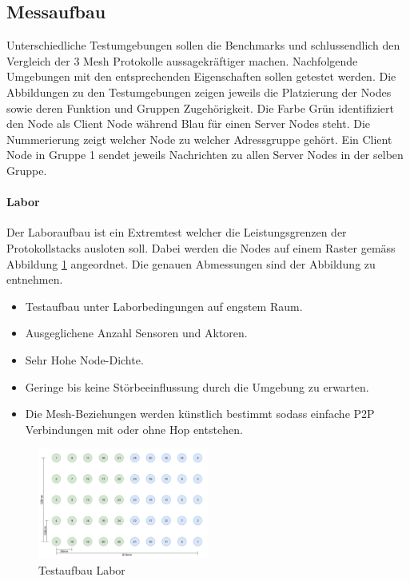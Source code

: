 \newpage
\subsection{Messaufbau}
Unterschiedliche Testumgebungen sollen die Benchmarks und schlussendlich den Vergleich der 3 Mesh Protokolle aussagekräftiger machen. Nachfolgende Umgebungen mit den entsprechenden Eigenschaften sollen getestet werden. Die Abbildungen zu den Testumgebungen zeigen jeweils die Platzierung der Nodes sowie deren Funktion und Gruppen Zugehörigkeit. Die Farbe Grün identifiziert den Node als Client Node während Blau für einen Server Nodes steht. Die Nummerierung zeigt welcher Node zu welcher Adressgruppe gehört. Ein Client Node in Gruppe 1 sendet jeweils Nachrichten zu allen Server Nodes in der selben Gruppe.

\paragraph{Labor}
Der Laboraufbau ist ein Extremtest welcher die Leistungsgrenzen der Protokollstacks ausloten soll. Dabei werden die Nodes auf einem Raster gemäss Abbildung \ref{fig:TestaufbauLabor} angeordnet. Die genauen Abmessungen sind der Abbildung zu entnehmen.

\begin{itemize}
	\item Testaufbau unter Laborbedingungen auf engstem Raum.
	\item Ausgeglichene Anzahl Sensoren und Aktoren.
	\item Sehr Hohe Node-Dichte.
	\item Geringe bis keine Störbeeinflussung durch die Umgebung zu erwarten.
	\item Die Mesh-Beziehungen werden künstlich bestimmt sodass einfache P2P Verbindungen mit oder ohne Hop entstehen.
\end{itemize}

\begin{figure}
	\centering
	\includegraphics[width=0.5\textwidth]{graphics/Testaufbau_Labor.png}
	\caption{Testaufbau Labor}
	\label{fig:TestaufbauLabor}
\end{figure}

